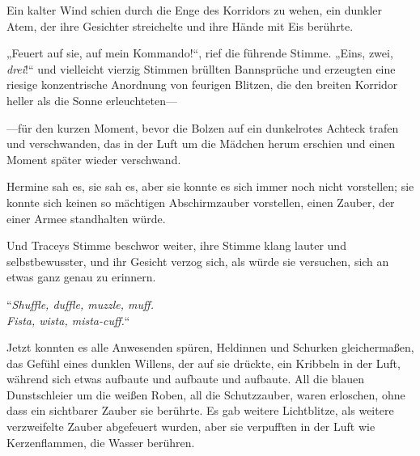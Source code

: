 Ein kalter Wind schien durch die Enge des Korridors zu wehen, ein dunkler Atem, der ihre Gesichter streichelte und ihre Hände mit Eis berührte.

„Feuert auf sie, auf mein Kommando!“, rief die führende Stimme. „Eins, zwei, \emph{drei}!“ und vielleicht vierzig Stimmen brüllten Bannsprüche und erzeugten eine riesige konzentrische Anordnung von feurigen Blitzen, die den breiten Korridor heller als die Sonne erleuchteten—

—für den kurzen Moment, bevor die Bolzen auf ein dunkelrotes Achteck trafen und verschwanden, das in der Luft um die Mädchen herum erschien und einen Moment später wieder verschwand.

Hermine sah es, sie sah es, aber sie konnte es sich immer noch nicht vorstellen; sie konnte sich keinen so mächtigen Abschirmzauber vorstellen, einen Zauber, der einer Armee standhalten würde.

Und Traceys Stimme beschwor weiter, ihre Stimme klang lauter und selbstbewusster, und ihr Gesicht verzog sich, als würde sie versuchen, sich an etwas ganz genau zu erinnern.

“\emph{Shuffle, duffle, muzzle, muff.\\
Fista, wista, mista-cuff.}“

Jetzt konnten es alle Anwesenden spüren, Heldinnen und Schurken gleichermaßen, das Gefühl eines dunklen Willens, der auf sie drückte, ein Kribbeln in der Luft, während sich etwas aufbaute und aufbaute und aufbaute. All die blauen Dunstschleier um die weißen Roben, all die Schutzzauber, waren erloschen, ohne dass ein sichtbarer Zauber sie berührte. Es gab weitere Lichtblitze, als weitere verzweifelte Zauber abgefeuert wurden, aber sie verpufften in der Luft wie Kerzenflammen, die Wasser berühren.

